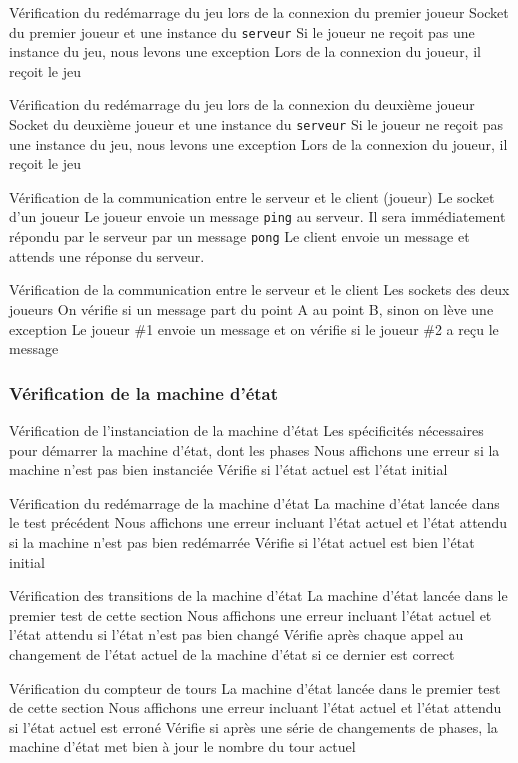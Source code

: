 \mytest
{Vérification du redémarrage du jeu lors de la connexion du premier joueur}
{Socket du premier joueur et une instance du \texttt{serveur}}
{Si le joueur ne reçoit pas une instance du jeu, nous levons une exception}
{Lors de la connexion du joueur, il reçoit le jeu}

\mytest
{Vérification du redémarrage du jeu lors de la connexion du deuxième joueur}
{Socket du deuxième joueur et une instance du \texttt{serveur}}
{Si le joueur ne reçoit pas une instance du jeu, nous levons une exception}
{Lors de la connexion du joueur, il reçoit le jeu}

\mytest
{Vérification de la communication entre le serveur et le client (joueur)}
{Le socket d'un joueur}
{Le joueur envoie un message \texttt{ping} au serveur. Il sera immédiatement répondu par le serveur par un message \texttt{pong}}
{Le client envoie un message et attends une réponse du serveur.}

\mytest
{Vérification de la communication entre le serveur et le client}
{Les sockets des deux joueurs}
{On vérifie si un message part du point A au point B, sinon on lève une exception}
{Le joueur \#1 envoie un message  et on vérifie si le joueur \#2 a reçu le message}

\subsubsection{Vérification de la machine d'état}
\mytest
{Vérification de l'instanciation de la machine d'état}
{Les spécificités nécessaires pour démarrer la machine d'état, dont les phases}
{Nous affichons une erreur si la machine n'est pas bien instanciée}
{Vérifie si l'état actuel est l'état initial}

\mytest
{Vérification du redémarrage de la machine d'état}
{La machine d'état lancée dans le test précédent}
{Nous affichons une erreur incluant l'état actuel et l'état attendu si la machine n'est pas bien redémarrée}
{Vérifie si l'état actuel est bien l'état initial}

\mytest
{Vérification des transitions de la machine d'état}
{La machine d'état lancée dans le premier test de cette section}
{Nous affichons une erreur incluant l'état actuel et l'état attendu si l'état n'est pas bien changé}
{Vérifie après chaque appel au changement de l'état actuel de la machine d'état si ce dernier est correct}

\mytest
{Vérification du compteur de tours}
{La machine d'état lancée dans le premier test de cette section}
{Nous affichons une erreur incluant l'état actuel et l'état attendu si l'état actuel est erroné}
{Vérifie si après une série de changements de phases, la machine d'état met bien à jour le nombre du tour actuel}

